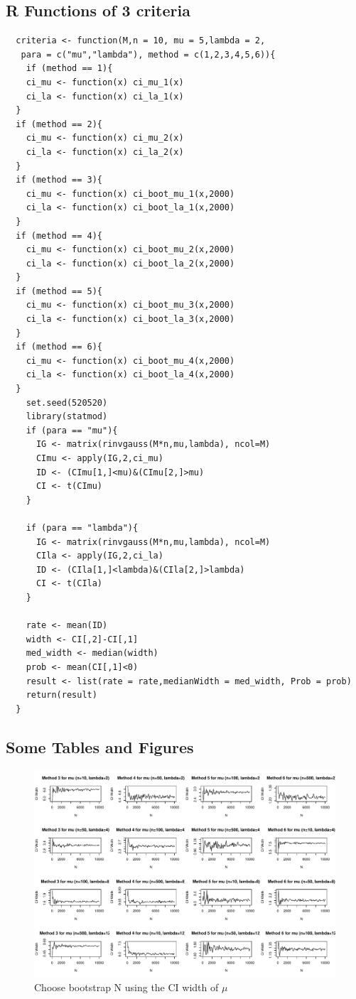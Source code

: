 \documentclass[12pt]{article}
\begin{document}
\subsection{R Functions of 3 criteria}
\noindent\makebox[\linewidth]{\rule{\textwidth}{1pt}}
\begin{verbatim}
  criteria <- function(M,n = 10, mu = 5,lambda = 2,
   para = c("mu","lambda"), method = c(1,2,3,4,5,6)){
    if (method == 1){
    ci_mu <- function(x) ci_mu_1(x)
    ci_la <- function(x) ci_la_1(x)
  }
  if (method == 2){
    ci_mu <- function(x) ci_mu_2(x)
    ci_la <- function(x) ci_la_2(x)
  }
  if (method == 3){
    ci_mu <- function(x) ci_boot_mu_1(x,2000)
    ci_la <- function(x) ci_boot_la_1(x,2000)
  }
  if (method == 4){
    ci_mu <- function(x) ci_boot_mu_2(x,2000)
    ci_la <- function(x) ci_boot_la_2(x,2000)
  }
  if (method == 5){
    ci_mu <- function(x) ci_boot_mu_3(x,2000)
    ci_la <- function(x) ci_boot_la_3(x,2000)
  }
  if (method == 6){
    ci_mu <- function(x) ci_boot_mu_4(x,2000)
    ci_la <- function(x) ci_boot_la_4(x,2000)
  }
    set.seed(520520)
    library(statmod)
    if (para == "mu"){
      IG <- matrix(rinvgauss(M*n,mu,lambda), ncol=M)
      CImu <- apply(IG,2,ci_mu)
      ID <- (CImu[1,]<mu)&(CImu[2,]>mu)
      CI <- t(CImu)
    }
    
    if (para == "lambda"){
      IG <- matrix(rinvgauss(M*n,mu,lambda), ncol=M)
      CIla <- apply(IG,2,ci_la)
      ID <- (CIla[1,]<lambda)&(CIla[2,]>lambda)
      CI <- t(CIla)
    }
    
    rate <- mean(ID)
    width <- CI[,2]-CI[,1]
    med_width <- median(width)
    prob <- mean(CI[,1]<0)
    result <- list(rate = rate,medianWidth = med_width, Prob = prob)
    return(result)
  }
\end{verbatim}
\noindent\makebox[\linewidth]{\rule{\textwidth}{1pt}}

\subsection{Some Tables and Figures}

\begin{figure}[h] 
\includegraphics[width=1.0\textwidth]{findN_mu.pdf}
\caption{Choose bootstrap N using the CI width of $\mu$}
\end{figure}
\end{document}
